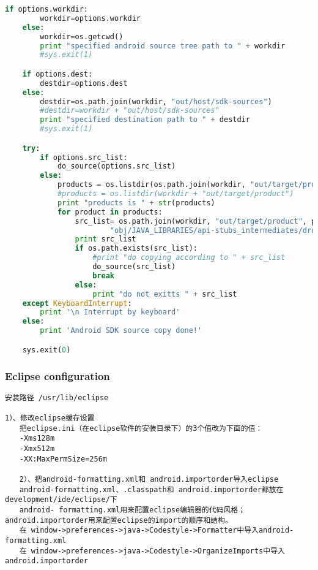 \documentclass[a4paper,titlepage]{article}
\begin{document}
\begin{lstlisting}[language=python]
    if options.workdir:
        workdir=options.workdir
    else:
        workdir=os.getcwd()
        print "specified android source tree path to " + workdir
        #sys.exit(1)

    if options.dest:
        destdir=options.dest
    else:
        destdir=os.path.join(workdir, "out/host/sdk-sources")
        #destdir=workdir + "out/host/sdk-sources"
        print "specified destination path to " + destdir
        #sys.exit(1)

    try:
        if options.src_list:
            do_source(options.src_list)
        else:
            products = os.listdir(os.path.join(workdir, "out/target/product"))
            #products = os.listdir(workdir + "out/target/product")
            print "products is " + str(products)
            for product in products:
                src_list= os.path.join(workdir, "out/target/product", product,
                        "obj/JAVA_LIBRARIES/api-stubs_intermediates/droiddoc-src-list")
                print src_list
                if os.path.exists(src_list):
                    #print "do copying according to " + src_list
                    do_source(src_list)
                    break
                else:
                    print "do not exitts " + src_list
    except KeyboardInterrupt:
        print '\n Interrupt by keyboard'
    else:
        print 'Android SDK source copy done!'

    sys.exit(0)
\end{lstlisting}

\subsubsection{Eclipse configuration}
\begin{verbatim}
安装路径 /usr/lib/eclipse

1）、修改eclipse缓存设置
　　把eclipse.ini（在eclipse软件的安装目录下）的3个值改为下面的值：
　　-Xms128m
　　-Xmx512m
　　-XX:MaxPermSize=256m

　　2）、把android-formatting.xml和 android.importorder导入eclipse
　　android-formatting.xml、.classpath和 android.importorder都放在development/ide/eclipse/下
　　android- formatting.xml用来配置eclipse编辑器的代码风格；android.importorder用来配置eclipse的import的顺序和结构。
　　在 window->preferences->java->Codestyle->Formatter中导入android- formatting.xml
　　在 window->preferences->java->Codestyle->OrganizeImports中导入 android.importorder 
\end{verbatim}
\end{document}

